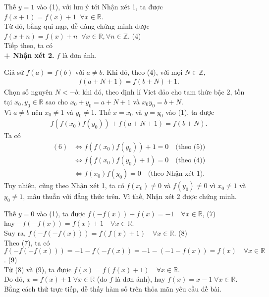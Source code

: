\begin{bt}
{\begin{itemize}
			Thế $y=1$ vào (1), với lưu ý tới Nhận xét 1, ta được $f(x+1)=f(x)+1 \;\; \forall x \in \mathbb{R}$.\\
			Từ đó, bằng qui nạp, dễ dàng chứng minh được $f(x+n)=f(x)+n \;\; \forall x \in \mathbb{R}, \forall n \in \mathbb{Z}$. \hfill (4)\\
			Tiếp theo, ta có\\
			\textbf{+ Nhận xét 2.} $f$ là đơn ánh.
			\begin{cm}
				Giả sử $f(a)=f(b)$ với $a \ne b$.  Khi đó, theo (4), với mọi $N \in \mathbb{Z}$, 
				\begin{align*}
					f(a+N+1)=f(b+N)+1. \tag{5}
				\end{align*}
				Chọn số nguyên $N<-b$; khi đó, theo định lí Viet đảo cho tam thức bậc 2, tồn tại $x_0, y_0 \in \mathbb{R}$ sao cho
				$x_0+y_0=a+N+1$ và $x_0y_0=b+N$.\\
				Vì $a \ne b$ nên $x_0 \ne 1$ và $y_0 \ne 1$. Thế $x=x_0$ và $y=y_0$ vào (1), ta được
				\begin{align*}
					f(f(x_0)f(y_0))+f(a+N+1)=f(b+N). \tag{6}
				\end{align*}
				Ta có
				\begin{align*}
					(6)& \Leftrightarrow f(f(x_0)f(y_0))+1=0 \quad\text{(theo (5))}\\ 
					& \Leftrightarrow f(f(x_0)f(y_0)+1)=0  \quad\text{(theo (4))}\\
					&\Leftrightarrow f(x_0)f(y_0)=0  \quad\text{(theo Nhận xét 1)}.
				\end{align*}Tuy nhiên, cũng theo Nhận xét 1, ta có $f(x_0) \ne 0$ và $f(y_0) \ne 0$ vì $x_0 \ne 1$ và $y_0 \ne 1$, mâu thuẫn với đẳng thức trên. Vì thế, Nhận xét 2 được chứng minh.
			\end{cm}
			Thế $y=0$ vào (1), ta được $f(-f(x))+f(x)=-1 \quad \forall x \in \mathbb{R}$, \hfill (7)\\
			hay $-f(-f(x))=f(x)+1\quad \forall x \in \mathbb{R}$.\\
			Suy ra, $f(-f(-f(x)))=f(f(x)+1) \quad \forall x \in \mathbb{R}$. \hfill (8)\\
			Theo (7), ta có $f(-f(-f(x)))=-1-f(-f(x))=-1-(-1-f(x))=f(x) \quad \forall x \in \mathbb{R}$. \hfill (9)\\
			Từ (8) và (9), ta được $f(x)=f(f(x)+1)  \quad \forall x \in \mathbb{R}$.\\
			Do đó, $x=f(x)+1  \; \forall x \in \mathbb{R}$ (do $f$ là đơn ánh), hay $f(x)=x-1 \;\forall x \in \mathbb{R}$.\\
			Bằng cách thử trực tiếp, dễ thấy hàm số trên thỏa mãn yêu cầu đề bài.\\

\end{itemize}}
\end{bt}
